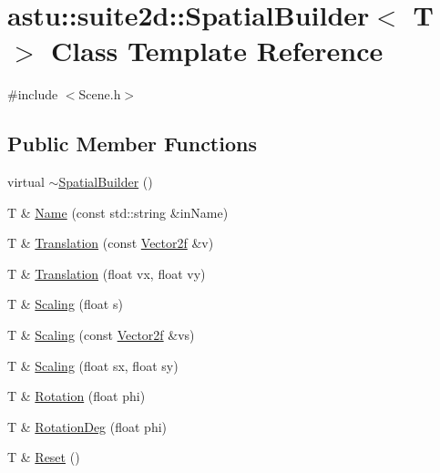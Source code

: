 \hypertarget{classastu_1_1suite2d_1_1SpatialBuilder}{}\section{astu\+:\+:suite2d\+:\+:Spatial\+Builder$<$ T $>$ Class Template Reference}
\label{classastu_1_1suite2d_1_1SpatialBuilder}


{\ttfamily \#include $<$Scene.\+h$>$}

\subsection*{Public Member Functions}
\begin{DoxyCompactItemize}
\item 
virtual \hyperlink{classastu_1_1suite2d_1_1SpatialBuilder_a8c525562114d436d4ccfc2cc42e7658a}{$\sim$\+Spatial\+Builder} ()
\item 
T \& \hyperlink{classastu_1_1suite2d_1_1SpatialBuilder_a9acc5dba2568c4c5e9ee1b4b04c3e490}{Name} (const std\+::string \&in\+Name)
\item 
T \& \hyperlink{classastu_1_1suite2d_1_1SpatialBuilder_a4a39f76b987baf04c79ef1232ca3df7e}{Translation} (const \hyperlink{classastu_1_1Vector2}{Vector2f} \&v)
\item 
T \& \hyperlink{classastu_1_1suite2d_1_1SpatialBuilder_a5e5638a6a92f89fdcbf5da0d5fb2490a}{Translation} (float vx, float vy)
\item 
T \& \hyperlink{classastu_1_1suite2d_1_1SpatialBuilder_aca653817b053db2fe3c9d0640ab95f05}{Scaling} (float s)
\item 
T \& \hyperlink{classastu_1_1suite2d_1_1SpatialBuilder_a536ee9865573bcbeaa1b9db996610eeb}{Scaling} (const \hyperlink{classastu_1_1Vector2}{Vector2f} \&vs)
\item 
T \& \hyperlink{classastu_1_1suite2d_1_1SpatialBuilder_a085a3c05bc1f45a49336ebf7a275a522}{Scaling} (float sx, float sy)
\item 
T \& \hyperlink{classastu_1_1suite2d_1_1SpatialBuilder_addc0ef5adbf83cfeba15f9d66613315a}{Rotation} (float phi)
\item 
T \& \hyperlink{classastu_1_1suite2d_1_1SpatialBuilder_aebb7300a60d30a4bf07723b977718e11}{Rotation\+Deg} (float phi)
\item 
T \& \hyperlink{classastu_1_1suite2d_1_1SpatialBuilder_a3a9b7716087f96e4d621c2472123c497}{Reset} ()
\end{DoxyCompactItemize}
